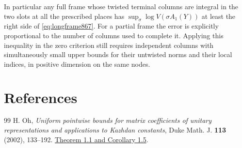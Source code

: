 \documentclass[a4paper,11pt]{article}
\theoremstyle{definition}
\theoremstyle{remark}
\numberwithin{equation}{section}
\begin{document}
In particular any full frame whose twisted terminal columns
are integral in the two slots at all the prescribed places
has \(\sup_\sigma\log V(\sigma A_1(Y))\) at least the
right side of \eqref{eq:longframe867}. For a partial frame
the error is explicitly proportional to the number of
columns used to complete it. Applying this inequality in the
zero criterion still requires independent columns with
simultaneously small upper bounds for their untwisted norms
and their local indices, in positive dimension on the same nodes.
\clearpage

\clearpage
\section{References}\label{nav:bibliography-XVI}
\begingroup{}\begin{thebibliography}{99}\small
{} H. Oh, \emph{Uniform pointwise bounds for matrix coefficients of unitary representations and applications to Kazhdan constants}, Duke Math. J. \textbf{113} (2002), 133--192. \href{https://bpb-us-w2.wpmucdn.com/campuspress.yale.edu/dist/5/5177/files/2025/11/mat.pdf}{Theorem 1.1 and Corollary 1.5}.
\end{thebibliography}\endgroup
\end{document}
